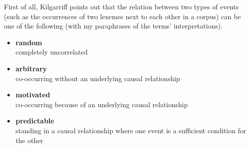 First of all, Kilgarriff points out that the relation between two types of events (such as the occurrences of two lexemes next to each other in a corpus) can be one of the following (with my paraphrases of the terms' interpretations).

\vspace{\baselineskip}

\begin{itemize}
  \item \textbf{random}\\
    completely uncorrelated
  \item \textbf{arbitrary}\\
    co-occurring without an underlying causal relationship
  \item \textbf{motivated}\\
    co-occurring because of an underlying causal relationship
  \item \textbf{predictable}\\
    standing in a causal relationship where one event is a sufficient condition for the other
\end{itemize}

\vspace{\baselineskip}

